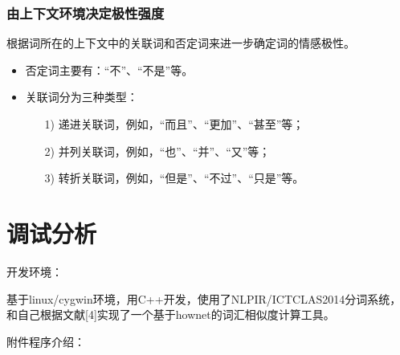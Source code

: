 \documentclass[11pt,a4paper]{article}
\begin{document}
\subsubsection{由上下文环境决定极性强度}

根据词所在的上下文中的关联词和否定词来进一步确定词的情感极性。

\begin{itemize}
\item 否定词主要有：“不”、“不是”等。
\item 关联词分为三种类型：
\begin{enumerate}
\item[1)] 递进关联词，例如，“而且”、“更加”、“甚至”等；
\item[2)] 并列关联词，例如，“也”、“并”、“又”等；
\item[3)] 转折关联词，例如，“但是”、“不过”、“只是”等。
\end{enumerate}
\end{itemize}

\section{调试分析}


开发环境：

基于linux/cygwin环境，用C++开发，使用了NLPIR/ICTCLAS2014分词系统，和自己根据文献[4]实现了一个基于hownet的词汇相似度计算工具。\vspace{6pt}

附件程序介绍：
\end{document}
